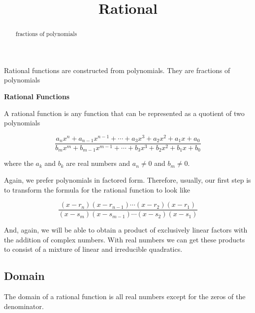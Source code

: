 \documentclass{ximera}
\title{Rational}
\begin{document}
\begin{abstract}
fractions of polynomials
\end{abstract}
\maketitle




Rational functions are constructed from polynomials. They are fractions of polynomials


\begin{definition}\textbf{\textcolor{green!50!black}{Rational Functions}}

A rational function is any function that can be represented as a quotient of two polynomials 

\[   \frac{ a_n x^n + a_{n-1} x^{n-1} + \cdots + a_3 x^3 + a_2 x^2 + a_1 x + a_0  } { b_m x^m + b_{m-1} x^{m-1} + \cdots + b_3 x^3 + b_2 x^2 + b_1 x + b_0 }   \]



where the $a_k$ and $b_k$ are real numbers and $a_n \ne 0$ and $b_m \ne 0$.





\end{definition}




Again, we prefer polynomials in factored form.  Therefore, usually, our first step is to transform the formula for the rational function to look like



\[   \frac{ (x-r_n)(x-r_{n-1})  \cdots (x-r_2)(x-r_1)  } { (x-s_m)(x-s_{m-1})  \cdots (x-s_2)(x-s_1) }   \]




And, again, we will be able to obtain a product of exclusively linear factors with the addition of complex numbers.  With real numbers we can get these products to consist of a mixture of linear and irreducible quadratics.








\subsection*{Domain}


The domain of a rational function is all real numbers except for the zeros of the denominator.
\end{document}
